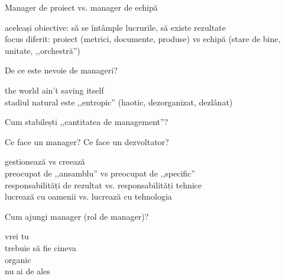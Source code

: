 \documentclass{simple}
\begin{document}
\begin{frame}{Manager de proiect vs. manager de echipă}
  \begin{center}
    \pause
    aceleași obiective: să se întâmple lucrurile, să existe rezultate \\
    \vspace{1cm}
    \pause
    focus diferit: proiect (metrici, documente, produse) vs echipă (stare de bine, unitate, ,,orchestră'')
  \end{center}
\end{frame}

\begin{frame}{De ce este nevoie de manageri?}
  \begin{center}
    \pause
    the world ain't saving itself \\
    \vspace{1cm}
    \pause
    stadiul natural este ,,entropic'' (haotic, dezorganizat, dezlânat)
  \end{center}
\end{frame}

\begin{frame}{}
  \begin{center}
    Cum stabilești ,,cantitatea de management''?
  \end{center}
\end{frame}

\begin{frame}{Ce face un manager? Ce face un dezvoltator?}
  \begin{center}
    \pause
    gestionează vs creează \\
    \vspace{1cm}
    \pause
    preocupat de ,,ansamblu'' vs preocupat de ,,specific'' \\
    \vspace{1cm}
    \pause
    responsabilități de rezultat vs. responsabilități tehnice \\
    \vspace{1cm}
    \pause
    lucrează cu oamenii vs. lucrează cu tehnologia
  \end{center}
\end{frame}

\begin{frame}{Cum ajungi manager (rol de manager)?}
  \begin{center}
    \pause
    vrei tu \\
    \vspace{1cm}
    \pause
    trebuie să fie cineva \\
    \vspace{1cm}
    \pause
    organic \\
    \vspace{1cm}
    \pause
    nu ai de ales
  \end{center}
\end{frame}
\end{document}
